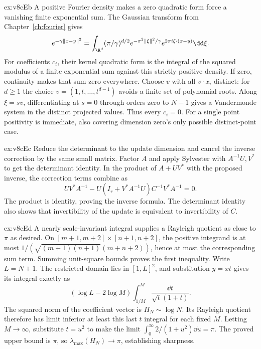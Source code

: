 \begin{solution}{ex:v8cEb}
\idea A positive Fourier density makes a zero quadratic form force a vanishing finite exponential sum.
\writeup The Gaussian transform from Chapter~\ref{ch:fourier} gives
\[e^{-\gamma\|x-y\|^2}=\int_{\R^d}(\pi/\gamma)^{d/2}e^{-\pi^2\|\xi\|^2/\gamma}e^{2\pi i\xi\cdot(x-y)}\dd\xi.
\]
For coefficients $c_i$, their kernel quadratic form is the integral of the squared modulus of a finite exponential sum against this strictly positive density. If zero, continuity makes that sum zero everywhere. Choose $v$ with all $v\cdot x_i$ distinct: for $d\ge1$ the choice $v=(1,t,\ldots,t^{d-1})$ avoids a finite set of polynomial roots. Along $\xi=sv$, differentiating at $s=0$ through orders zero to $N-1$ gives a Vandermonde system in the distinct projected values. Thus every $c_i=0$. For a single point positivity is immediate, also covering dimension zero's only possible distinct-point case.
\end{solution}
\begin{solution}{ex:v8cEc}
\idea Reduce the determinant to the update dimension and cancel the inverse correction by the same small matrix.
\writeup Factor $A$ and apply Sylvester with $A^{-1}U,V^*$ to get the determinant identity. In the product of $A+UV^*$ with the proposed inverse, the correction terms combine as
\[UV^*A^{-1}-U(I_r+V^*A^{-1}U)C^{-1}V^*A^{-1}=0.
\]
The product is identity, proving the inverse formula. The determinant identity also shows that invertibility of the update is equivalent to invertibility of $C$.
\end{solution}
\begin{solution}{ex:v8cEd}
\idea A nearly scale-invariant integral supplies a Rayleigh quotient as close to $\pi$ as desired.
\writeup On $[m+1,m+2]\times[n+1,n+2]$, the positive integrand is at most $1/(\sqrt{(m+1)(n+1)}(m+n+2))$, hence at most the corresponding sum term. Summing unit-square bounds proves the first inequality. Write $L=N+1$. The restricted domain lies in $[1,L]^2$, and substitution $y=xt$ gives its integral exactly as
\[(\log L-2\log M)\int_{1/M}^M\frac{\dd t}{\sqrt t(1+t)}.
\]
The squared norm of the coefficient vector is $H_N\sim\log N$. Its Rayleigh quotient therefore has limit inferior at least this last $t$ integral for each fixed $M$. Letting $M\to\infty$, substitute $t=u^2$ to make the limit $\int_0^\infty2/(1+u^2)\dd u=\pi$. The proved upper bound is $\pi$, so $\lambda_{\max}(H_N)\to\pi$, establishing sharpness.
\end{solution}

